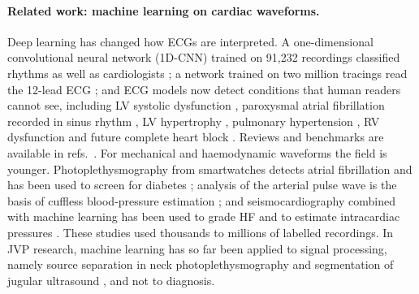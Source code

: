 \documentclass[11pt]{article}
\begin{document}
\paragraph{Related work: machine learning on cardiac waveforms.}
Deep learning has changed how ECGs are interpreted. A one-dimensional convolutional neural network (1D-CNN) trained on 91,232 recordings classified rhythms as well as cardiologists \cite{hannun2019cardiologist}; a network trained on two million tracings read the 12-lead ECG \cite{ribeiro2020automatic}; and ECG models now detect conditions that human readers cannot see, including LV systolic dysfunction \cite{attia2019screening,yao2021artificial}, paroxysmal atrial fibrillation recorded in sinus rhythm \cite{attia2019artificial}, LV hypertrophy \cite{kwon2020comparing}, pulmonary hypertension \cite{kwon2020artificial,aras2023electrocardiogram}, RV dysfunction \cite{vaid2022using} and future complete heart block \cite{sau2025artificial}. Reviews and benchmarks are available in refs.~\cite{siontis2021artificial,somani2021deep,topol2019high,wagner2020ptbxl,strodthoff2021deep}. For mechanical and haemodynamic waveforms the field is younger. Photoplethysmography from smartwatches detects atrial fibrillation \cite{tison2018passive,perez2019large} and has been used to screen for diabetes \cite{avram2020digital}; analysis of the arterial pulse wave is the basis of cuffless blood-pressure estimation \cite{mukkamala2015toward,elhajj2020review,kim2020detection}; and seismocardiography combined with machine learning has been used to grade HF and to estimate intracardiac pressures \cite{inan2015ballistocardiography,inan2018novel,shandhi2022estimation,klein2025noninvasive,etemadi2016wearable,stehlik2020continuous,lee2020mechano,ha2019chest,kaisti2019clinical}. These studies used thousands to millions of labelled recordings. In JVP research, machine learning has so far been applied to signal processing, namely source separation in neck photoplethysmography \cite{cao2026unmixing} and segmentation of jugular ultrasound \cite{zamboni2026artificial}, and not to diagnosis.
\end{document}
